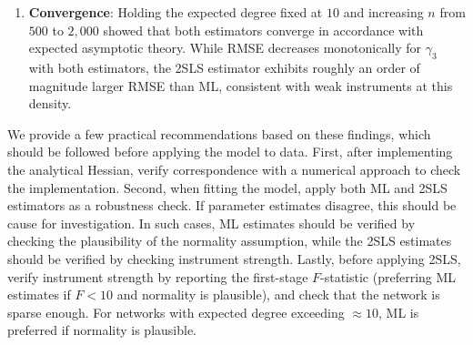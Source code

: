 \begin{enumerate}
    \item \textbf{Convergence}: Holding the expected degree fixed at $10$ and increasing $n$ from $500$ to $2{,}000$ showed that both estimators converge in accordance with expected asymptotic theory. While RMSE decreases monotonically for $\gamma_3$ with both estimators, the 2SLS estimator exhibits roughly an order of magnitude larger RMSE than ML, consistent with weak instruments at this density.
\end{enumerate}

We provide a few practical recommendations based on these findings, which should be followed before applying the model to data. First, after implementing the analytical Hessian, verify correspondence with a numerical approach to check the implementation. Second, when fitting the model, apply both ML and 2SLS estimators as a robustness check. If parameter estimates disagree, this should be cause for investigation. In such cases, ML estimates should be verified by checking the plausibility of the normality assumption, while the 2SLS estimates should be verified by checking instrument strength. Lastly, before applying 2SLS, verify instrument strength by reporting the first-stage $F$-statistic (preferring ML estimates if $F < 10$ and normality is plausible), and check that the network is sparse enough. For networks with expected degree exceeding $\approx 10$, ML is preferred if normality is plausible.

